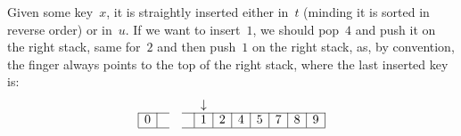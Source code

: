 Given some key~\(x\), it is straightly inserted either in~\(t\)
(minding it is sorted in reverse order) or in~\(u\). If we want to
insert~\(1\), we should pop~\(4\) and push it on the right stack, same
for~\(2\) and then push~\(1\) on the right stack, as, by convention,
the finger always points to the top of the right stack, where the last
inserted key is:
\begin{equation*}
\begin{array}{@{}|c|ccc|c|c|c|c|c|c|c|@{}}
  \multicolumn{1}{c}{} & \multicolumn{1}{c}{} & \multicolumn{1}{c}{}
& \multicolumn{1}{c}{} & \multicolumn{1}{c}{\downarrow}\\
\cline{1-2}\cline{4-11}
0 & & & & 1 & 2 & 4 & 5 & 7 & 8 & 9\\
\cline{1-2}\cline{4-11}
\end{array}
\end{equation*}

